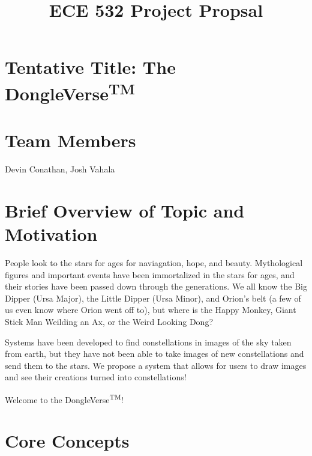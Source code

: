 \documentclass{article}
\title{ECE 532 Project Propsal}
\date{}
\author{}
\begin{document}


\maketitle

\section{Tentative Title: The DongleVerse\textsuperscript{TM\textregistered}}

\section{Team Members}
Devin Conathan, Josh Vahala

\section{Brief Overview of Topic and Motivation}
People look to the stars for ages for naviagation, hope, and beauty. Mythological figures and important events have been immortalized in the stars for ages, and their stories have been passed down through the generations. We all know the Big Dipper (Ursa Major), the Little Dipper (Ursa Minor), and Orion's belt (a few of us even know where Orion went off to), but where is the Happy Monkey, Giant Stick Man Weilding an Ax, or the Weird Looking Dong? \par
Systems have been developed to find constellations in images of the sky taken from earth, but they have not been able to take images of new constellations and send them to the stars. We propose a system that allows for users to draw images and see their creations turned into constellations! \par
Welcome to the DongleVerse\textsuperscript{TM\textregistered}! 

\section{Core Concepts}
\end{document}
